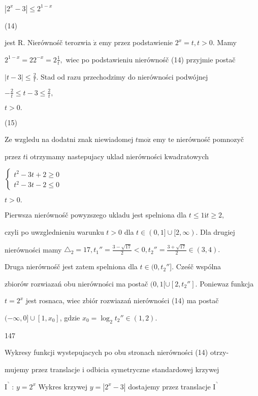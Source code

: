 \documentclass[a4paper,12pt]{article}
\begin{document}
$|2^{x}-3|\leq 2^{1-x}$

(14)

jest R. Nierównośč $\mathrm{t}\mathrm{e}\mathrm{r}$ozwia $\dot{\mathrm{z}}$ emy przez podstawienie $2^{x}=t, t>0$. Mamy

$2^{1-x}=22^{-x}=2\displaystyle \frac{1}{t},$ wiec po podstawieniu nierównośč (14) przyjmie postač

$|t-3|\displaystyle \leq\frac{2}{t}$. Stad od razu przechodzimy do nierówności podwójnej

$-\displaystyle \frac{2}{t}\leq t-3\leq\frac{2}{t},$

$t>0.$

(15)

Ze wzgledu na dodatni znak niewiadomej $t \mathrm{m}\mathrm{o}\dot{\mathrm{z}}$ emy $\mathrm{t}\mathrm{e}$ nierównośč pomnozyč

przez $t\mathrm{i}$ otrzymamy nastepujacy uklad nierówności kwadratowych

$\left\{\begin{array}{l}
t^{2}-3t+2\geq 0\\
t^{2}-3t-2\leq 0
\end{array}\right.$

$t>0.$

Pierwsza nierównośč powyzszego ukladu jest spelniona dla $t \leq 1 \mathrm{i}t \geq 2,$

czyli po uwzglednieniu warunku $t> 0$ dla $ t\in (0,1]\cup[2,\infty)$. Dla drugiej

nierówności mamy $\triangle_{2} = 17, t_{1}'' = \displaystyle \frac{3-\sqrt{17}}{2} < 0, t_{2}'' = \displaystyle \frac{3+\sqrt{17}}{2} \in (3,4).$

Druga nierównośč jest zatem spelniona dla $t \in (0,t_{2}''$]. Cześč wspólna

zbiorów rozwiazań obu nierówności ma postač $(0,1[\cup[2,t_{2}'']$. Poniewaz funkcja

$t = 2^{x}$ jest rosnaca, wiec zbiór rozwiazań nierówności (14) ma postač

$(-\infty,0]\cup[1,x_{0}]$, gdzie $x_{0}=\log_{2}t_{2}''\in(1,2).$





147

Wykresy funkcji wystepujacych po obu stronach nierówności (14) otrzy-

mujemy przez translacje $\mathrm{i}$ odbicia symetryczne standardowej krzywej

$\mathrm{I}^{\urcorner}$ : $y = 2^{x}$ Wykres krzywej $y = |2^{x}-3|$ dostajemy przez translacje $\mathrm{I}^{\urcorner}$
\end{document}
